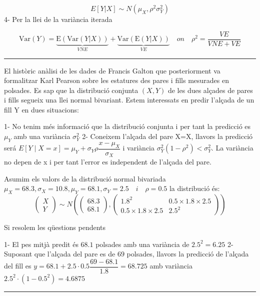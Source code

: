 \documentclass[
  catalan,
]{article}
\theoremstyle{definition}
\theoremstyle{definition}
\theoremstyle{definition}
\theoremstyle{definition}
\theoremstyle{remark}
\begin{document}
\[
 E[Y|X] \sim N(\mu_X,\rho^2 \sigma_Y^2)
\]
4- Per la llei de la variància iterada

\[
\text{Var}(Y) = \underbrace{\text{E}(\text{Var}(Y|X))}_{\textit{VNE}} + \underbrace{\text{Var}(\text{E}(Y|X))}_{\textit{VE}} \quad on \quad \rho^2= \frac {VE}{VNE+VE}
\]

\begin{center}\rule{0.5\linewidth}{0.5pt}\end{center}

El històric anàlisi de les dades de Francis Galton que posteriorment va formalitzar Karl Pearson sobre les estatures des pares i fills mesurades en polsades. Es sap que la distribució conjunta \((X,Y)\) de les dues alçades de pares i fills segueix una llei normal bivariant. Estem interessats en predir l'alçada de un fill Y en dues situacions:

1- No tenim més informació que la distribució conjunta i per tant la predicció es \(\mu_Y\) amb una variància \(\sigma_Y^2\)
2- Coneixem l'alçada del pare X=X, llavors la predicció será \(E[Y \mid X=x]=\mu_Y+\sigma_Y \rho \dfrac{x-\mu_X}{\sigma_X}\) i variància \(\sigma_Y^2 (1-\rho^2)<\sigma_Y^2\). La variància no depen de x i per tant l'error es independent de l'alçada del pare.

Asumim els valors de la distribució normal bivariada \(\mu_X=68.3, \sigma_X=10.8, \mu_Y=68.1, \sigma_Y=2.5 \quad i \quad \rho=0.5\) la distribució és:
\[
\begin{pmatrix}
X\\
Y
\end{pmatrix}
\sim
N
\left(
\begin{pmatrix}
68.3\\
68.1
\end{pmatrix},
\begin{pmatrix}
1.8^2 & 0.5 \times 1.8 \times 2.5 \\
 0.5 \times 1.8 \times 2.5 & 2.5^2
\end{pmatrix}
\right)
\]

Si resolem les qüestions pendents

1- El pes mitjà predit és \(68.1\) polsades amb una variància de \(2.5^2= 6.25\)
2- Suposant que l'alçada del pare es de \(69\) polsades, llavors la predicció de l'alçada del fill es \(y=68.1 + 2.5 · 0.5 \dfrac {69-68.1}{1.8}=68.725\) amb variància \(2.5^2 · (1-0.5^2)=4.6875\)

\begin{center}\rule{0.5\linewidth}{0.5pt}\end{center}
\end{document}

